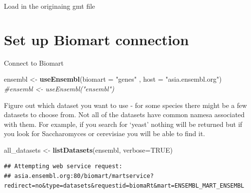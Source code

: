 \documentclass[
]{book}
\newenvironment{Shaded}{\begin{snugshade}}{\end{snugshade}}
\newcommand{\AttributeTok}[1]{\textcolor[rgb]{0.13,0.29,0.53}{#1}}
\newcommand{\CommentTok}[1]{\textcolor[rgb]{0.56,0.35,0.01}{\textit{#1}}}
\newcommand{\ConstantTok}[1]{\textcolor[rgb]{0.56,0.35,0.01}{#1}}
\newcommand{\FunctionTok}[1]{\textcolor[rgb]{0.13,0.29,0.53}{\textbf{#1}}}
\newcommand{\NormalTok}[1]{#1}
\newcommand{\OtherTok}[1]{\textcolor[rgb]{0.56,0.35,0.01}{#1}}
\newcommand{\SpecialCharTok}[1]{\textcolor[rgb]{0.81,0.36,0.00}{\textbf{#1}}}
\newcommand{\StringTok}[1]{\textcolor[rgb]{0.31,0.60,0.02}{#1}}
\begin{document}
Load in the originaing gmt file

\section{Set up Biomart connection}\label{set-up-biomart-connection-1}

Connect to Biomart

\begin{Shaded}
\begin{Highlighting}[]
\NormalTok{ensembl }\OtherTok{\textless{}{-}} \FunctionTok{useEnsembl}\NormalTok{(}\AttributeTok{biomart =} \StringTok{"genes"}\NormalTok{ , }\AttributeTok{host =} \StringTok{"asia.ensembl.org"}\NormalTok{)}
\CommentTok{\#ensembl \textless{}{-} useEnsembl("ensembl")}
\end{Highlighting}
\end{Shaded}

Figure out which dataset you want to use - for some species there might be a few datasets to choose from. Not all of the datasets have common namesa associated with them. For example, if you search for `yeast' nothing will be returned but if you look for Saccharomyces or cerevisiae you will be able to find it.

\begin{Shaded}
\begin{Highlighting}[]
\NormalTok{all\_datasets }\OtherTok{\textless{}{-}} \FunctionTok{listDatasets}\NormalTok{(ensembl, }\AttributeTok{verbose=}\ConstantTok{TRUE}\NormalTok{)}
\end{Highlighting}
\end{Shaded}

\begin{verbatim}
## Attempting web service request:
## asia.ensembl.org:80/biomart/martservice?redirect=no&type=datasets&requestid=biomaRt&mart=ENSEMBL_MART_ENSEMBL
\end{verbatim}

\begin{Shaded}
\end{Shaded}
\end{document}
